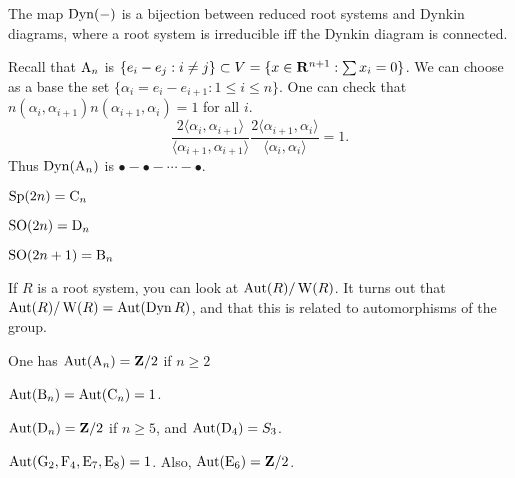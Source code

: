 The map $\operatorname{Dyn}(-)$ is a bijection between reduced root systems and Dynkin diagrams, 
where a root system is irreducible iff the Dynkin diagram is connected. 

\begin{example}
Recall that $\mathrm{A}_n$ is 
$\{e_i-e_j:i\ne j\}\subset V=\{x\in \mathbf{R}^{n+1}:\sum x_i=0\}$. We can choose as a 
base the set $\{\alpha_i=e_i-e_{i+1}:1\leqslant i\leqslant n\}$. One can check 
that $n(\alpha_i,\alpha_{i+1})n(\alpha_{i+1},\alpha_i)=1$ for all $i$. 
\[
  \frac{2\langle \alpha_i,\alpha_{i+1}\rangle}{\langle\alpha_{i+1},\alpha_{i+1}\rangle} \frac{2\langle\alpha_{i+1},\alpha_i\rangle}{\langle\alpha_i,\alpha_i\rangle} = 1 .
\]
Thus $\operatorname{Dyn}(\mathrm{A}_n)$ is $\bullet-\bullet-\cdots-\bullet$. 
\end{example}

$\operatorname{Sp}(2n)=\mathrm{C}_n$

$\operatorname{SO}(2n)=\mathrm{D}_n$

$\operatorname{SO}(2n+1)=\mathrm{B}_n$

If $R$ is a root system, you can look at $\operatorname{Aut}(R)/\operatorname{W}(R)$. It 
turns out that $\operatorname{Aut}(R)/\operatorname{W}(R)=\operatorname{Aut}(\operatorname{Dyn} R)$, and that 
this is related to automorphisms of the group. 

One has $\operatorname{Aut}(\mathrm{A}_n)=\mathbf{Z}/2$ if $n\geqslant 2$

$\operatorname{Aut}(\mathrm{B}_n)=\operatorname{Aut}(\mathrm{C}_n)=1$. 

$\operatorname{Aut}(\mathrm{D}_n)=\mathbf{Z}/2$ if $n\geqslant 5$, and 
$\operatorname{Aut}(\mathrm{D}_4)=S_3$. 

$\operatorname{Aut}(\mathrm{G}_2,\mathrm{F}_4,\mathrm{E}_7,\mathrm{E}_8)=1$. Also, 
$\operatorname{Aut}(\mathrm{E}_6)=\mathbf{Z}/2$. 



